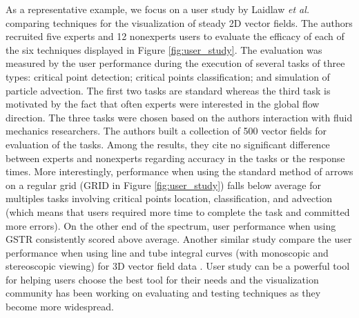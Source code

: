 As a representative example, we focus on a user study by Laidlaw \emph{et al.} \cite{Laidlaw:2005:CVF:1032290.1032538} comparing techniques for the visualization of steady 2D vector fields.
The authors recruited five experts and 12 nonexperts users to evaluate the efficacy of each of the six techniques displayed in Figure \ref{fig:user_study}. The evaluation was measured by the user performance during the execution of several tasks of three types: critical point detection; critical points classification; and simulation of particle advection. The first two tasks are standard whereas the third task is motivated by the fact that often experts were interested in the global flow direction. The three tasks were chosen based on the authors interaction with fluid mechanics researchers. 
The authors built a collection of 500 vector fields for evaluation of the tasks. Among the results, they cite no significant difference between experts and nonexperts regarding accuracy in the tasks or the response times. More interestingly, performance when using the standard method of arrows on a regular grid (GRID in Figure \ref{fig:user_study}) falls below average for multiples tasks involving critical points location, classification, and advection (which means that users required more time to complete the task and committed more errors). On the other end of the spectrum, user performance when using GSTR consistently scored above average. Another similar study compare the user performance when using line and tube integral curves (with monoscopic and stereoscopic viewing) for 3D vector field data \cite{Forsberg:2009:CVF:1638611.1639226}. User study can be a powerful tool for helping users choose the best tool for their needs and the visualization community has been working on evaluating and testing techniques as they become more widespread.


